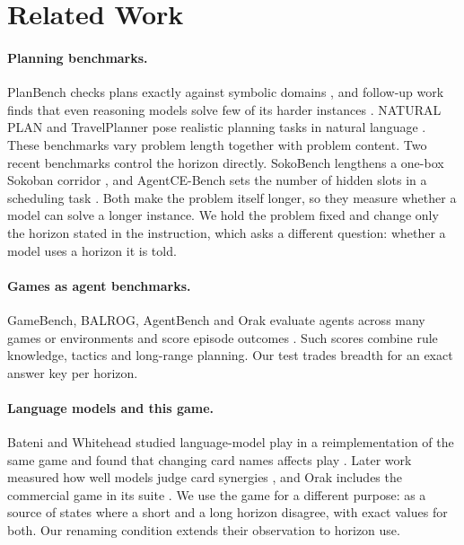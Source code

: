 \section{Related Work}
\label{sec:related}

\paragraph{Planning benchmarks.} PlanBench checks plans exactly against symbolic domains \citep{valmeekam2023planbench}, and follow-up work finds that even reasoning models solve few of its harder instances \citep{valmeekam2024o1,kambhampati2024position}. NATURAL PLAN and TravelPlanner pose realistic planning tasks in natural language \citep{zheng2024naturalplan,xie2024travelplanner}. These benchmarks vary problem length together with problem content. Two recent benchmarks control the horizon directly. SokoBench lengthens a one-box Sokoban corridor \citep{monti2026sokobench}, and AgentCE-Bench sets the number of hidden slots in a scheduling task \citep{yang2026agentce}. Both make the problem itself longer, so they measure whether a model can solve a longer instance. We hold the problem fixed and change only the horizon stated in the instruction, which asks a different question: whether a model uses a horizon it is told.

\paragraph{Games as agent benchmarks.} GameBench, BALROG, AgentBench and Orak evaluate agents across many games or environments and score episode outcomes \citep{costarelli2024gamebench,paglieri2025balrog,liu2024agentbench,park2025orak}. Such scores combine rule knowledge, tactics and long-range planning. Our test trades breadth for an exact answer key per horizon.

\paragraph{Language models and this game.} Bateni and Whitehead studied language-model play in a reimplementation of the same game and found that changing card names affects play \citep{bateni2024language}. Later work measured how well models judge card synergies \citep{kim2025synergy}, and Orak includes the commercial game in its suite \citep{park2025orak}. We use the game for a different purpose: as a source of states where a short and a long horizon disagree, with exact values for both. Our renaming condition extends their observation to horizon use.

